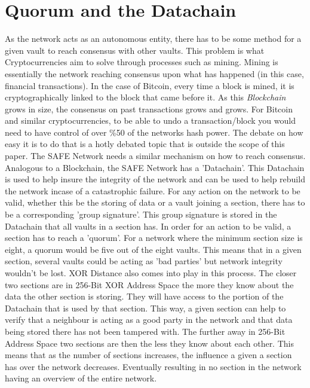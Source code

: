 \documentclass{l4proj}
\begin{document}
\section{Quorum and the Datachain}

As the network acts as an autonomous entity, there has to be some method for a given vault to reach consensus with other vaults. This problem is what Cryptocurrencies aim to solve through processes such as mining. Mining is essentially the network reaching consensus upon what has happened (in this case, financial transactions). In the case of Bitcoin, every time a block is mined, it is cryptographically linked to the block that came before it. As this \textit{Blockchain} grows in size, the consensus on past transactions grows and grows. For Bitcoin and similar cryptocurrencies, to be able to undo a transaction/block you would need to have control of over \%50 of the networks hash power. The debate on how easy it is to do that is a hotly debated topic that is outside the scope of this paper. The SAFE Network needs a similar mechanism on how to reach consensus. Analogous to a Blockchain, the SAFE Network has a 'Datachain'. This Datachain is used to help insure the integrity of the network and can be used to help rebuild the network incase of a catastrophic failure. For any action on the network to be valid, whether this be the storing of data or a vault joining a section, there has to be a corresponding 'group signature'. This group signature is stored in the Datachain that all vaults in a section has. In order for an action to be valid, a section has to reach a 'quorum'. For a network where the minimum section size is eight, a quorum would be five out of the eight vaults. This means that in a given section, several vaults could be acting as 'bad parties' but network integrity wouldn't be lost. XOR Distance also comes into play in this process. The closer two sections are in 256-Bit XOR Address Space the more they know about the data the other section is storing. They will have access to the portion of the Datachain that is used by that section. This way, a given section can help to verify that a neighbour is acting as a good party in the network and that data being stored there has not been tampered with. The further away in 256-Bit Address Space two sections are then the less they know about each other. This means that as the number of sections increases, the influence a given a section has over the network decreases. Eventually resulting in no section in the network having an overview of the entire network.
\end{document}
